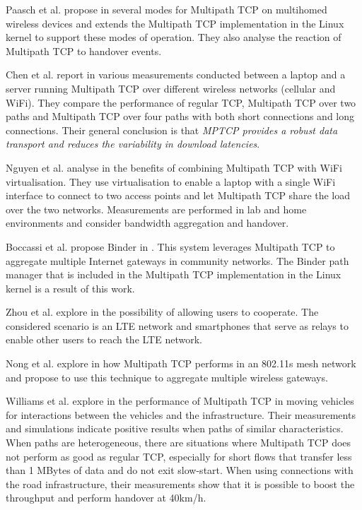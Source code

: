 Paasch et al. propose in \cite{Paasch_Exploring:2012} several modes for Multipath TCP on multihomed wireless devices and extends the Multipath TCP implementation in the Linux kernel to support these modes of operation. They also analyse the reaction of Multipath TCP to handover events. 

Chen et al. report in \cite{Chen_Measurement:2013} various measurements conducted between a laptop and a server running Multipath TCP over different wireless networks (cellular and WiFi). They compare the performance of regular TCP, Multipath TCP over two paths and Multipath TCP over four paths with both short connections and long connections. Their general conclusion is that \emph{ MPTCP provides a robust data transport and reduces the variability in download latencies}.


Nguyen et al. analyse in \cite{Nguyen_cross-layer:2014} the benefits of combining Multipath TCP with WiFi virtualisation. They use virtualisation to enable a laptop with a single WiFi interface to connect to two access points and let Multipath TCP share the load over the two networks. Measurements are performed in lab and home environments and consider bandwidth aggregation and handover. 

Boccassi et al. propose  Binder in \cite{Boccassi_Binder:2013}. This system leverages Multipath TCP to aggregate multiple Internet gateways in community networks. The Binder path manager that is included in the Multipath TCP implementation in the Linux kernel is a result of this work. %

Zhou et al. explore in \cite{Zhou_cooperation:2015} the possibility of allowing users to cooperate. The considered scenario is an LTE network and smartphones that serve as relays to enable other users to reach the LTE network.

Nong et al. explore in \cite{Nong_Aggregating:2014} how Multipath TCP performs in an 802.11s mesh network and propose to use this technique to aggregate multiple wireless gateways.

Williams et al. explore in \cite{Williams_Vehicular:2014} the performance of Multipath TCP in moving vehicles for interactions between the vehicles and the infrastructure. Their measurements and simulations indicate positive results when paths of similar characteristics. When paths are heterogeneous, there are situations where Multipath TCP does not perform as good as regular TCP, especially for short flows that transfer less than 1 MBytes of data and do not exit slow-start. When using connections with the road infrastructure, their measurements show that it is possible to boost the throughput and perform handover at 40km/h. 


